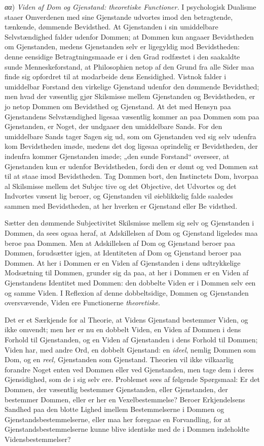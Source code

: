 \documentclass[12pt]{book}
\newcommand{\opage}[1]{\marginnote{\footnotesize\textit{[#1]}}}
\begin{document}
\textit{αα}) \emph{Viden af Dom og Gjenstand: theoretiske
Functioner.} I psychologisk Dualisme staaer Omverdenen
med sine Gjenstande udvortes imod den betragtende, tænkende,
dømmende Bevidsthed. At Gjenstanden i sin umiddelbare
Selvstændighed falder udenfor Dommen; at Dommen kun
angaaer Bevidstheden om Gjenstanden, medens Gjenstanden
selv er ligegyldig mod Bevidstheden: denne eensidige Betragtningsmaade
er i den Grad rodfæstet i den saakaldte sunde
Menneskeforstand, at Philosophien netop af den Grund fra
alle Sider maa finde sig opfordret til at modarbeide dens
Eensidighed. Vistnok falder i umiddelbar Forstand den virkelige
Gjenstand udenfor den dømmende Bevidsthed; men hvad
der væsentlig gjør Skilsmisse mellem Gjenstanden og Bevidstheden,
er jo netop Dommen om Bevidsthed og Gjenstand.
At det med Hensyn paa Gjenstandens Selvstændighed ligesaa
væsentlig kommer an paa Dommen som paa Gjenstanden, er
Noget, der undgaaer den umiddelbare Sands. For den
umiddelbare Sands tager Sagen sig ud, som om Gjenstanden
ved sig selv udenfra kom Bevidstheden imøde, medens det dog
ligesaa oprindelig er Bevidstheden, der indenfra kommer Gjenstanden
imøde; „den sunde Forstand“ overseer, at Gjenstanden
kun er udenfor Bevidstheden, fordi den er dømt og ved Dommen
\opage{102}sat til at staae imod Bevidstheden. Tag Dommen bort, den
Instinctets Dom, hvorpaa al Skilsmisse mellem det Subjec%
tive og det Objective, det Udvortes og det Indvortes væsent%
lig beroer, og Gjenstanden vil øieblikkelig falde saaledes sammen
med Bevidstheden, at her hverken er Gjenstand eller Be%
vidsthed.

Sætter den dømmende Subjectivitet Skilsmisse mellem
sig selv og Gjenstanden i Dommen, da sees ogsaa heraf, at
Adskillelsen af Dom og Gjenstand ligeledes maa beroe paa
Dommen. Men at Adskillelsen af Dom og Gjenstand beroer
paa Dommen, forudsætter igjen, at Identiteten af Dom
og Gjenstand beroer paa Dommen. At her i Dommen er
en Viden af Gjenstanden i dens udtrykkelige Modsætning til
Dommen, grunder sig da paa, at her i Dommen er en
Viden af Gjenstandens Identitet med Dommen: den dobbelte
Viden er i Dommen selv een og samme Viden. I Reflexion
af denne dobbeltsidige, Dommen og Gjenstanden oversvævende,
Viden ere Functionerne \emph{theoretiske}.

Det er et Særkjende for al Theorie, at Videns Gjenstand
bestemmer Viden, og ikke omvendt; men her er nu en
dobbelt Viden, en Viden af Dommen i dens Forhold til
Gjenstanden, og en Viden af Gjenstanden i dens Forhold
til Dommen; Viden har, med andre Ord, en dobbelt Gjenstand:
en \emph{ideel}, nemlig Dommen som Dom, og en \emph{reel,}
Gjenstanden som Gjenstand. Theorien vil ikke vilkaarlig forandre
Noget enten ved Dommen eller ved Gjenstanden, men
tage dem i deres Gjensidighed, som de i sig selv ere. Problemet
sees af følgende Spørgsmaal: Er det Dommen, der
væsentlig bestemmer Gjenstanden, eller Gjenstanden, der bestemmer
Dommen, eller er her en Vexelbestemmelse? Beroer
Erkjendelsens Sandhed paa den blotte Lighed imellem Bestemmelserne
i Dommen og Gjenstandsbestemmelserne, eller maa
her foregaae en Forvandling, for at Gjenstandsbestemmelserne
\opage{103}kunne blive identiske med de i Dommen indeholdte Vidensbestemmelser?
\end{document}
